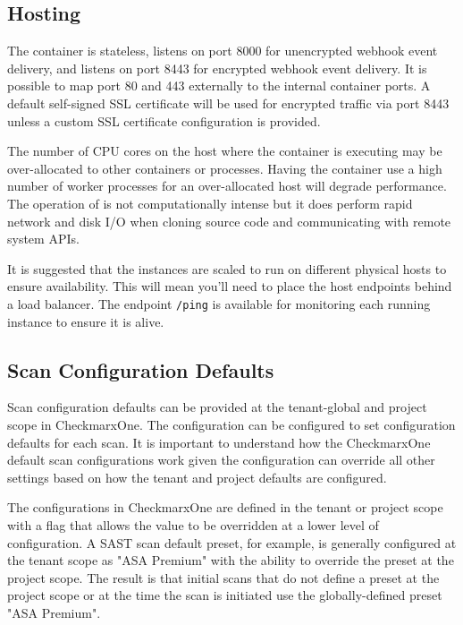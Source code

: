 \subsection{Hosting}

The \cxoneflow container is stateless, listens on port 8000 for unencrypted webhook event delivery, 
and listens on port 8443 for encrypted webhook event delivery.  It is possible to map port 80 and 443
externally to the internal container ports.  A default self-signed SSL certificate will be used
for encrypted traffic via port 8443 unless a custom SSL certificate configuration is provided.  

The number of CPU cores on the host where the container is executing may be over-allocated to other
containers or processes.  Having the container use a high number of worker processes for an over-allocated
host will degrade performance.  The operation of \cxoneflow is not computationally intense
but it does perform rapid network and disk I/O when cloning source code and communicating with
remote system APIs.

It is suggested that the \cxoneflow instances are scaled to run on different physical hosts to
ensure availability.  This will mean you'll need to place the \cxoneflow host endpoints behind 
a load balancer.  The \cxoneflow endpoint \texttt{/ping} is available for monitoring each
running instance to ensure it is alive.

\subsection{Scan Configuration Defaults}\label{sec:deployment-scan-defaults}

Scan configuration defaults can be provided at the tenant-global and project scope
in CheckmarxOne.  The \cxoneflow configuration can be configured to set configuration
defaults for each scan.  It is important to understand how the CheckmarxOne default
scan configurations work given the \cxoneflow configuration can override all other
settings based on how the tenant and project defaults are configured.

The configurations in CheckmarxOne are defined in the tenant or project scope with a
flag that allows the value to be overridden at a lower level of configuration.  A
SAST scan default preset, for example, is generally configured at the tenant scope
as "ASA Premium" with the ability to override the preset at the project scope.  The
result is that initial scans that do not define a preset at the project scope or
at the time the scan is initiated use the globally-defined preset "ASA Premium".

